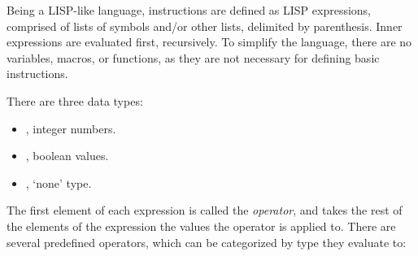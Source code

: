 Being a LISP-like language, instructions are defined as LISP expressions, comprised of lists of symbols and/or other lists, delimited by parenthesis. Inner expressions are evaluated first, recursively. To simplify the language, there are no variables, macros, or functions, as they are not necessary for defining basic instructions.

\noindent
There are three data types:
\begin{itemize}
  \item {}, integer numbers.
  \item {}, boolean values.
  \item {}, `none' type.
\end{itemize}

The first element of each expression is called the \textit{operator}, and takes the rest of the elements of the expression the values the operator is applied to. There are several predefined operators, which can be categorized by type they evaluate to:
